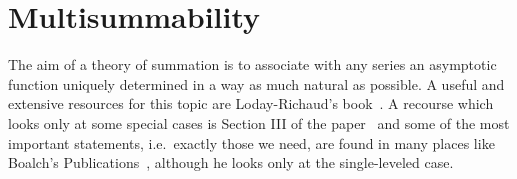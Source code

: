 
\chapter{Multisummability}\label{app:multisummability}
\begin{comment}
  \cite[Sec.III.2]{Loday1994},
  \cite[Chap.6]{Loday2014} and
  \cite[Chap.8]{Loday2014}
\end{comment}
The aim of a theory of summation is  to associate with any series an asymptotic
function uniquely determined in a way as much natural as possible.
A useful and extensive resources for this topic are Loday-Richaud's
book~\cite{Loday2014}.
A recourse which looks only at some special cases is Section III of the
paper~\cite{Loday1994} and some of the most important statements, i.e.\
exactly those we need, are found in many places like Boalch's
Publications~\cite{boalch,thboalch}, although he looks only at the
single-leveled case.

